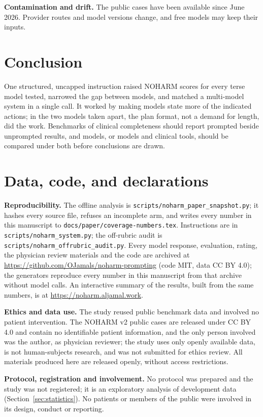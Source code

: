 \documentclass[11pt]{article}
\begin{document}
\textbf{Contamination and drift.} The public cases have been available since June 2026. Provider
routes and model versions change, and free models may keep their inputs.

\section{Conclusion}
\label{sec:conclusion}
One structured, uncapped instruction raised NOHARM scores for every terse model tested, narrowed the
gap between models, and matched a multi-model system in a single call. It worked by making models
state more of the indicated actions; in the two models taken apart, the plan format, not a demand for
length, did the work.
Benchmarks of clinical completeness should report prompted beside unprompted results, and models, or
models and clinical tools, should be compared under both before conclusions are drawn.

\section*{Data, code, and declarations}
\textbf{Reproducibility.} The offline analysis is \nolinkurl{scripts/noharm_paper_snapshot.py}; it
hashes every source file, refuses an incomplete arm, and writes every number in this manuscript to
\nolinkurl{docs/paper/coverage-numbers.tex}. Instructions are in
\nolinkurl{scripts/noharm_system.py}; the off-rubric audit is
\nolinkurl{scripts/noharm_offrubric_audit.py}. Every model response, evaluation, rating, the
physician review materials and the code are archived at
\url{https://github.com/OJamals/noharm-prompting} (code MIT, data CC BY 4.0); the generators
reproduce every number in this manuscript from that archive without model calls. An interactive
summary of the results, built from the same numbers, is at \url{https://noharm.aljamal.work}.

\textbf{Ethics and data use.} The study reused public benchmark data and involved no patient
intervention. The NOHARM v2 public cases are released under CC BY 4.0 and contain no identifiable
patient information, and the only person involved was the author, as physician reviewer; the study
uses only openly available data, is not human-subjects research, and was not submitted for ethics
review. All materials
produced here are released openly, without access restrictions.

\textbf{Protocol, registration and involvement.} No protocol was prepared and the study was not
registered; it is an exploratory analysis of development data (Section~\ref{sec:statistics}). No
patients or members of the public were involved in its design, conduct or reporting.
\end{document}
